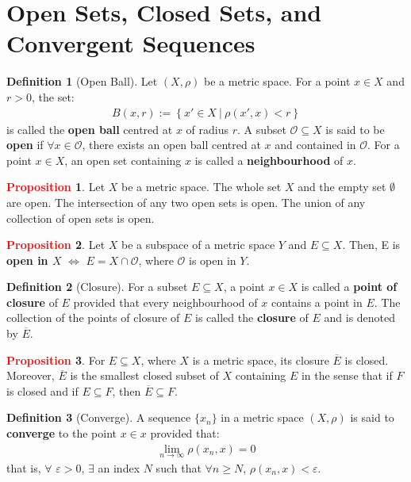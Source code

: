 \documentclass[11pt]{article}
\newcommand{\open}[0]{\mathcal{O}}
\theoremstyle{definition}
\theoremstyle{definition}
\newcommand{\sets}[2]{ \left\{ #1\ |\ #2 \right\}}
\theoremstyle{definition}
\newtheorem{definition}{\textcolor{OliveGreen}{Definition}}
\newtheorem{prop}{\textcolor{red}{Proposition}}
\theoremstyle{remark}
\begin{document}
\section{Open Sets, Closed Sets, and Convergent Sequences}

\begin{definition}[Open Ball]
	Let $(X, \rho)$ be a metric space. For a point $x \in X$ and $r>0$, the set: 
	\begin{align}
		B(x,r) := \sets{x' \in X}{\rho(x', x) < r}
	\end{align}
	is called the \textbf{open ball} centred at $x$ of radius $r$. A subset $\open \subseteq X$ is said to be \textbf{open} if $\forall x \in \open$, there exists an open ball centred at $x$ and contained in $\open$. For a point $x \in X$, an open set containing $x$ is called a \textbf{neighbourhood} of $x$.  
\end{definition}

\begin{prop}
	Let $X$ be a metric space. The whole set $X$ and the empty set $\emptyset$ are open. The intersection of any two open sets is open. The union of any collection of open sets is open. 
\end{prop}

\begin{prop}
	Let $X$ be a subspace of a metric space $Y$ and $E \subseteq X$. Then, E is \textbf{open in $X$} $\iff$ $E = X \cap \open$, where $\open$ is open in $Y$. 
\end{prop}

\begin{definition}[Closure]
	For a subset $E \subseteq X$, a point $x \in X$ is called a \textbf{point of closure} of $E$ provided that every neighbourhood of $x$ contains a point in $E$. The collection of the points of closure of $E$ is called the \textbf{closure} of $E$ and is denoted by $\overline{E}$. 
\end{definition}

\begin{prop}
	For $E \subseteq X$, where $X$ is a metric space, its closure $\overline{E}$ is closed. Moreover, $\overline{E}$ is the smallest closed subset of $X$ containing $E$ in the sense that if $F$ is closed and if $E \subseteq F$, then $\overline{E} \subseteq F$. 
\end{prop}

\begin{definition}[Converge]
	A sequence $\{ x_n \}$ in a metric space $(X, \rho)$ is said to \textbf{converge} to the point $x \in x$ provided that: 
	\begin{align*}
		\lim_{n \rightarrow \infty} \rho(x_n, x) = 0 	
	\end{align*}
	that is, $\forall$ $\varepsilon > 0$, $\exists$ an index $N$ such that $\forall n \geq N$, $\rho(x_n, x) < \varepsilon$. 
\end{definition}
\end{document}

